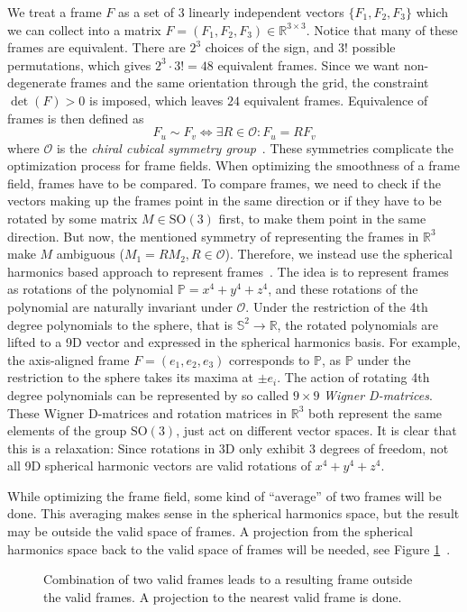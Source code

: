 \documentclass[../thesis.tex]{subfiles}
\begin{document}
We treat a frame $F$ as a set of 3 linearly independent vectors $\{F_1,F_2,F_3 \}$ which we can
collect into a matrix $F=(F_1,F_2,F_3) \in \mathbb{R}^{3\times 3}$.
Notice that many of these frames are equivalent.
There are $2^3$ choices of the sign, and $3!$ possible permutations, which
gives $2^3\cdot 3! = 48$ equivalent frames.
Since we want non-degenerate frames and the same orientation through the grid, the constraint $\det(F)>0$ is imposed,
which leaves $24$ equivalent frames.
Equivalence of frames is then defined as
$$F_u \sim F_v \iff \exists R \in \mathcal{O} : F_u=RF_v$$
where $\mathcal{O}$ is the \emph{chiral cubical symmetry group}~\cite{Nieser}.
These symmetries complicate the optimization process for frame fields.
When optimizing the smoothness of a frame field, frames have to be compared.
To compare frames, we need to check if the vectors making up
the frames point in the same direction or if they have to be rotated
by some matrix $M \in \mathrm{SO}(3)$ first, to make them point in the same direction.
But now, the mentioned symmetry of representing the frames in $\mathbb{R}^3$
make $M$ ambiguous (${M_1 = RM_2, R \in \mathcal{O}}$).
Therefore, we instead use the spherical harmonics based approach to represent frames~\cite{Huang}.
The idea is to represent frames as rotations of the polynomial $\mathbb{P}=x^4+y^4+z^4$,
and these rotations of the polynomial are naturally invariant under $\mathcal{O}$.
Under the restriction of the 4th degree polynomials to the sphere, that is $\mathbb{S}^2\to \mathbb{R}$,
the rotated polynomials are lifted to a 9D vector and expressed in the spherical harmonics basis.
For example, the axis-aligned frame $F=(e_1,e_2,e_3)$ corresponds
to $\mathbb{P}$, as $\mathbb{P}$ under the restriction to the sphere takes its maxima at $\pm e_i$.
The action of rotating 4th degree polynomials can be represented by so called $9\times9$ \emph{Wigner D-matrices}.
These Wigner D-matrices and rotation matrices in $\mathbb{R}^3$ both represent the
same elements of the group $\mathrm{SO}(3)$, just act on different vector spaces.
It is clear that this is a relaxation: Since rotations in 3D only exhibit 3 degrees of freedom, not all 9D spherical harmonic vectors are valid rotations
of $x^4+y^4+z^4$.

While optimizing the frame field, some kind of ``average'' of two frames will be done.
This averaging makes sense in the spherical harmonics space, but the result may be outside the valid
space of frames. A projection from the spherical
harmonics space back to the valid space of frames will be needed, see Figure \ref{fig:projection}~\cite{Ray}.
\begin{figure}[htb]
  \centering
  \def\svgwidth{30em}
  
  \caption{Combination of two valid frames leads to a resulting frame outside the valid frames. A projection to the nearest valid frame is done.}
  \label{fig:projection}
\end{figure}
\end{document}
